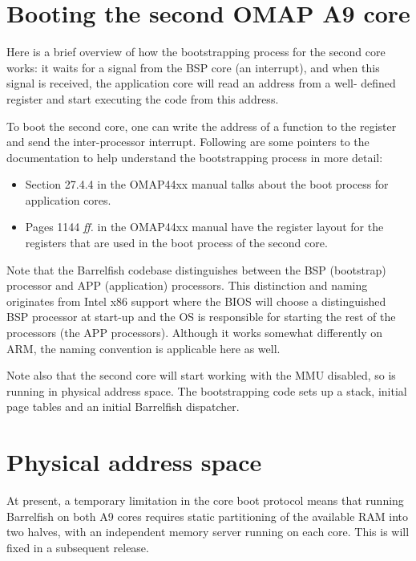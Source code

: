 \documentclass[a4paper,twoside]{report} %
\begin{document}
\section{Booting the second OMAP A9 core}


Here is a brief overview of how the bootstrapping process for the second core
works: it waits for a signal from the BSP core (an interrupt), and when this
signal is received, the application core will read an address from a well-
defined register and start executing the code from this address.

To boot the second core, one can write the address of
a function to the register and send the inter-processor
interrupt. Following are some pointers to the documentation to help
understand the bootstrapping process in more detail:

\begin{itemize}
\item Section 27.4.4 in the OMAP44xx manual talks about the boot process for
  application cores.
\item Pages 1144 \textit{ff.} in the OMAP44xx manual have the register
  layout for the registers that are used in the boot process of the
  second core. 
\end{itemize}

Note that the Barrelfish codebase distinguishes between the BSP (bootstrap)
processor and APP (application) processors. This distinction and naming
originates from Intel x86 support where the BIOS will choose a
distinguished BSP processor at start-up and the OS 
is responsible for starting the rest of the processors (the APP
processors). Although it works somewhat differently on 
ARM, the naming convention is applicable here as well.

Note also that the second core will start working with the MMU
disabled, so is running in physical address space.  The bootstrapping
code sets up a stack, initial page tables and an initial Barrelfish
dispatcher.

\section{Physical address space}

At present, a temporary limitation in the core boot protocol means
that running Barrelfish on both A9 cores requires static partitioning of
the available RAM into two halves, with an independent memory server
running on each core.   This is will fixed in a subsequent release. 
\end{document}
